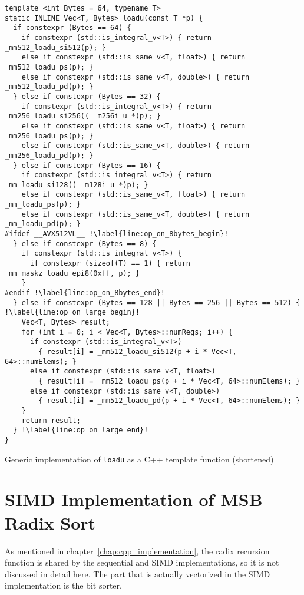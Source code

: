 \documentclass[12pt, a4paper, openright, twoside]{tiarbeit}
\begin{document}
\begin{listing}[h!]
  \begin{verbatim}
template <int Bytes = 64, typename T>
static INLINE Vec<T, Bytes> loadu(const T *p) {
  if constexpr (Bytes == 64) {
    if constexpr (std::is_integral_v<T>) { return _mm512_loadu_si512(p); }
    else if constexpr (std::is_same_v<T, float>) { return _mm512_loadu_ps(p); }
    else if constexpr (std::is_same_v<T, double>) { return _mm512_loadu_pd(p); }
  } else if constexpr (Bytes == 32) {
    if constexpr (std::is_integral_v<T>) { return _mm256_loadu_si256((__m256i_u *)p); }
    else if constexpr (std::is_same_v<T, float>) { return _mm256_loadu_ps(p); }
    else if constexpr (std::is_same_v<T, double>) { return _mm256_loadu_pd(p); }
  } else if constexpr (Bytes == 16) {
    if constexpr (std::is_integral_v<T>) { return _mm_loadu_si128((__m128i_u *)p); }
    else if constexpr (std::is_same_v<T, float>) { return _mm_loadu_ps(p); }
    else if constexpr (std::is_same_v<T, double>) { return _mm_loadu_pd(p); }
#ifdef __AVX512VL__ !\label{line:op_on_8bytes_begin}!
  } else if constexpr (Bytes == 8) {
    if constexpr (std::is_integral_v<T>) {
      if constexpr (sizeof(T) == 1) { return _mm_maskz_loadu_epi8(0xff, p); }
    }
#endif !\label{line:op_on_8bytes_end}!
  } else if constexpr (Bytes == 128 || Bytes == 256 || Bytes == 512) { !\label{line:op_on_large_begin}!
    Vec<T, Bytes> result;
    for (int i = 0; i < Vec<T, Bytes>::numRegs; i++) {
      if constexpr (std::is_integral_v<T>)
        { result[i] = _mm512_loadu_si512(p + i * Vec<T, 64>::numElems); }
      else if constexpr (std::is_same_v<T, float>)
        { result[i] = _mm512_loadu_ps(p + i * Vec<T, 64>::numElems); }
      else if constexpr (std::is_same_v<T, double>)
        { result[i] = _mm512_loadu_pd(p + i * Vec<T, 64>::numElems); }
    }
    return result;
  } !\label{line:op_on_large_end}!
}
  \end{verbatim}
  \caption{Generic implementation of \texttt{loadu} as a C++ template function (shortened)}
  \label{lst:cpp_simd_loadu}
\end{listing}

\chapter{SIMD Implementation of MSB Radix Sort}\label{chap:simd_radix_sort}

As mentioned in chapter~\ref{chap:cpp_implementation}, the radix recursion
function is shared by the sequential and SIMD implementations, so it is
not discussed in detail here. The part that is actually vectorized in the
SIMD implementation is the bit sorter.
\end{document}
